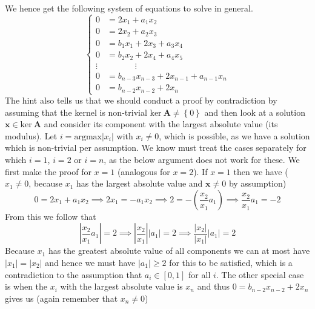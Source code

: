 \documentclass{article}
\begin{document}
We hence get the following system of equations to solve in general.
\begin{equation*}
    \begin{cases}
        0 &= 2x_{1} + a_{1}x_{2}  \\
        0&=2x_{2} + a_{2}x_{3}  \\
        0&=b_{1}x_{1} + 2x_{3} + a_{3}x_{4} \\
        0&=b_{2}x_{2} + 2x_{4} + a_{4}x_{5} \\
        \vdots&\phantom{=} \qquad \vdots \\
        0&=b_{n-3}x_{n-3} + 2x_{n-1} + a_{n-1}x_{n} \\
        0&=b_{n-2}x_{n-2} + 2x_{n}
    \end{cases}
\end{equation*}
The hint also tells us that we should conduct a proof by contradiction by assuming that the kernel is non-trivial $\text{ker} \: \mathbf{A} \neq \left\{0\right\}$ and then look at a solution $\mathbf{x} \in \text{ker} \: \mathbf{A}$ and consider its component with the largest absolute value (its modulus). Let $i = \text{argmax}\left\lvert x_{i}\right\rvert$ with $x_{i} \neq 0$, which is possible, as we have a solution which is non-trivial per assumption. We know must treat the cases separately for which $i = 1$, $i = 2$ or $i = n$, as the below argument does not work for these. We first make the proof for $x = 1$ (analogous for $x=2$). If $x = 1$ then we have ($x_{1} \neq 0$, because $x_{1}$ has the largest absolute value and $\mathbf{x}\neq 0$ by assumption)
\begin{equation*}
    0 = 2x_{1} + a_{1}x_{2} \implies 2x_{1} = -a_{1}x_{2} \implies 2 = -\left(\frac{x_{2}}{x_{1}}a_{1} \right) \implies \frac{x_{2}}{x_{1}}a_{1} = -2
\end{equation*}
From this we follow that 
\begin{equation*}
    \left\lvert \frac{x_{2}}{x_{1}}a_{1}\right\rvert = 2 \implies \left\lvert \frac{x_{2}}{x_{1}}\right\rvert \left\lvert a_{1}\right\rvert = 2 \implies  \frac{\left\lvert x_{2}\right\rvert}{\left\lvert x_{1}\right\rvert} \left\lvert a_{1}\right\rvert = 2 
\end{equation*}
Because $x_{1}$ has the greatest absolute value of all components we can at most have $\left\lvert x_{1}\right\rvert = \left\lvert x_{2}\right\rvert$ and hence we must have $\left\lvert a_{1}\right\rvert \geq 2$ for this to be satisfied, which is a contradiction to the assumption that $a_{i} \in \left[0,1\right]$ for all $i$. The other special case is when the $x_{i}$ with the largest absolute value is $x_{n}$ and thus $0 = b_{n-2}x_{n-2} + 2x_{n}$  gives us (again remember that $x_{n} \neq 0$)
\end{document}
